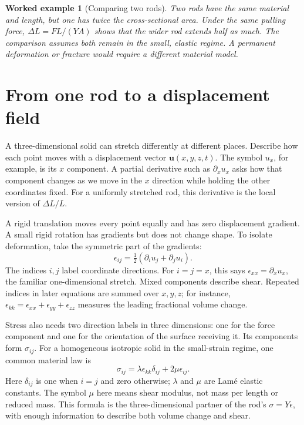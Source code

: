 \documentclass[11pt,oneside]{book}
\newcommand{\vect}[1]{\boldsymbol{#1}}
\theoremstyle{reviewstyle}
\newtheorem{example}{Worked example}[chapter]
\begin{document}
\begin{example}[Comparing two rods]
Two rods have the same material and length, but one has twice the cross-sectional area. Under the same pulling force, $\Delta L=FL/(YA)$ shows that the wider rod extends half as much. The comparison assumes both remain in the small, elastic regime. A permanent deformation or fracture would require a different material model.
\end{example}

\section{From one rod to a displacement field}
A three-dimensional solid can stretch differently at different places. Describe how each point moves with a displacement vector $\vect u(x,y,z,t)$. The symbol $u_x$, for example, is its $x$ component. A partial derivative such as $\partial_xu_x$ asks how that component changes as we move in the $x$ direction while holding the other coordinates fixed. For a uniformly stretched rod, this derivative is the local version of $\Delta L/L$.

A rigid translation moves every point equally and has zero displacement gradient. A small rigid rotation has gradients but does not change shape. To isolate deformation, take the symmetric part of the gradients:
\begin{equation}
\epsilon_{ij}=\tfrac12(\partial_i u_j+\partial_j u_i).
\end{equation}
The indices $i,j$ label coordinate directions. For $i=j=x$, this says $\epsilon_{xx}=\partial_xu_x$, the familiar one-dimensional stretch. Mixed components describe shear. Repeated indices in later equations are summed over $x,y,z$; for instance, $\epsilon_{kk}=\epsilon_{xx}+\epsilon_{yy}+\epsilon_{zz}$ measures the leading fractional volume change.

Stress also needs two direction labels in three dimensions: one for the force component and one for the orientation of the surface receiving it. Its components form $\sigma_{ij}$. For a homogeneous isotropic solid in the small-strain regime, one common material law is
\begin{equation}
\sigma_{ij}=\lambda\epsilon_{kk}\delta_{ij}+2\mu\epsilon_{ij}.
\end{equation}
Here $\delta_{ij}$ is one when $i=j$ and zero otherwise; $\lambda$ and $\mu$ are Lam\'e elastic constants. The symbol $\mu$ here means shear modulus, not mass per length or reduced mass. This formula is the three-dimensional partner of the rod's $\sigma=Y\epsilon$, with enough information to describe both volume change and shear.
\end{document}
